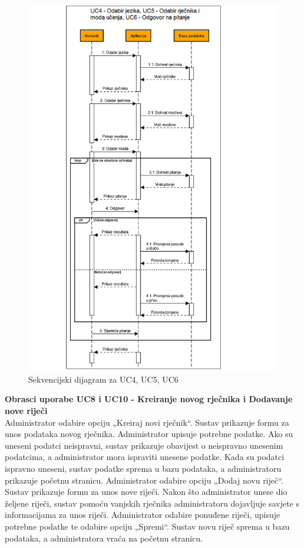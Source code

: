 				\begin{figure}[H]
					\includegraphics[width=\textwidth]{slike/UC4,UC5,UC6.PNG}
					\caption{Sekvencijski dijagram za UC4, UC5, UC6}
					\label{fig:sekv3}
				\end{figure} \newpage
				
				
				\noindent\textbf{Obrasci uporabe UC8 i UC10 - Kreiranje novog rječnika i Dodavanje nove riječi}\\
				Administrator odabire opciju „Kreiraj novi rječnik“. Sustav prikazuje formu za unos podataka novog rječnika. Administrator upisuje potrebne podatke. Ako su uneseni podatci neispravni, sustav prikazuje obavijest o neispravno unesenim podatcima, a administrator mora ispraviti unesene podatke. Kada su podatci ispravno uneseni, sustav podatke sprema u bazu podataka, a administratoru prikazuje početnu stranicu. Administrator odabire opciju „Dodaj novu riječ“. Sustav prikazuje formu za unos nove riječi. Nakon što administrator unese dio željene riječi, sustav pomoću vanjskih rječnika administratoru dojavljuje savjete s informacijama za unos riječi. Administrator odabire ponuđene riječi, upisuje potrebne podatke te odabire opciju „Spremi“. Sustav novu riječ sprema u bazu podataka, a administratora vraća na početnu stranicu.
				
